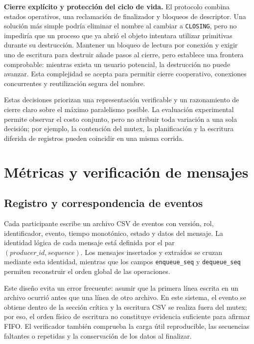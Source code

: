 \documentclass[conference]{IEEEtran}
\begin{document}
\textbf{Cierre explícito y protección del ciclo de vida.} El protocolo combina estados operativos, una reclamación de finalizador y bloqueos de descriptor. Una solución más simple podría eliminar el nombre al cambiar a \texttt{CLOSING}, pero no impediría que un proceso que ya abrió el objeto intentara utilizar primitivas durante su destrucción. Mantener un bloqueo de lectura por conexión y exigir uno de escritura para destruir añade pasos al cierre, pero establece una frontera comprobable: mientras exista un usuario potencial, la destrucción no puede avanzar. Esta complejidad se acepta para permitir cierre cooperativo, conexiones concurrentes y reutilización segura del nombre.

Estas decisiones priorizan una representación verificable y un razonamiento de cierre claro sobre el máximo paralelismo posible. La evaluación experimental permite observar el costo conjunto, pero no atribuir toda variación a una sola decisión; por ejemplo, la contención del mutex, la planificación y la escritura diferida de registros pueden coincidir en una misma corrida.

\section{Métricas y verificación de mensajes}
\subsection{Registro y correspondencia de eventos}
Cada participante escribe un archivo CSV de eventos con versión, rol, identificador, evento, tiempo monotónico, estado y datos del mensaje. La identidad lógica de cada mensaje está definida por el par \((\textit{producer\_id},\textit{sequence})\). Los mensajes insertados y extraídos se cruzan mediante esta identidad, mientras que los campos \texttt{enqueue\_seq} y \texttt{dequeue\_seq} permiten reconstruir el orden global de las operaciones.

Este diseño evita un error frecuente: asumir que la primera línea escrita en un archivo ocurrió antes que una línea de otro archivo. En este sistema, el evento se obtiene dentro de la sección crítica y la escritura CSV se realiza fuera del mutex; por eso, el orden físico de escritura no constituye evidencia suficiente para afirmar FIFO. El verificador también comprueba la carga útil reproducible, las secuencias faltantes o repetidas y la conservación de los datos al finalizar.
\end{document}
